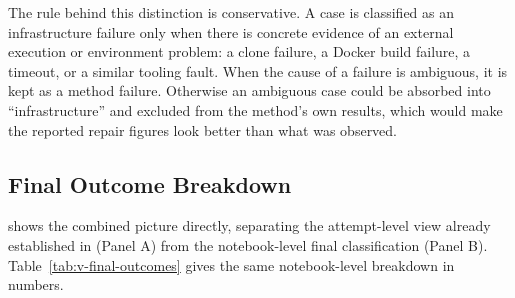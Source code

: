 The rule behind this distinction is conservative. A case is classified as
an infrastructure failure only when there is concrete evidence of an
external execution or environment problem: a clone failure, a Docker
build failure, a timeout, or a similar tooling fault. When the cause of a
failure is ambiguous, it is kept as a method failure. Otherwise an
ambiguous case could be absorbed into ``infrastructure'' and excluded
from the method's own results, which would make the reported repair
figures look better than what was observed.

\subsection{Final Outcome Breakdown}
\label{sec:v-final-breakdown}

 shows the combined picture directly, separating
the attempt-level view already established in
(Panel A) from the notebook-level final classification (Panel B).
Table~\ref{tab:v-final-outcomes} gives the same notebook-level breakdown in
numbers.

